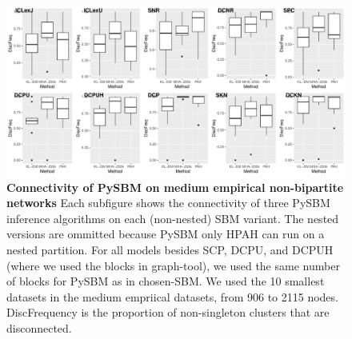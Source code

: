 \documentclass[aps,pre,superscriptaddress]{article}
\begin{document}
\begin{figure}[!htpb]
	\centering
	\includegraphics[width=\textwidth]{figures/pysbm_disc.pdf}
	\caption[]{
		\textbf{Connectivity of PySBM on medium empirical non-bipartite networks}
		Each subfigure shows the connectivity of three PySBM inference algorithms on each (non-nested) SBM variant.
		The nested versions are ommitted because PySBM only HPAH can run on a nested partition.
		For all models besides SCP, DCPU, and DCPUH (where we used the blocks in graph-tool), we used the same number of blocks for PySBM as in chosen-SBM.
		We used the 10 smallest datasets in the medium empriical datasets, from 906 to 2115 nodes.
		DiscFrequency is the proportion of non-singleton clusters that are disconnected.
	}
	\label{fig:pysbm_disc.pdf}
\end{figure}
\end{document}
